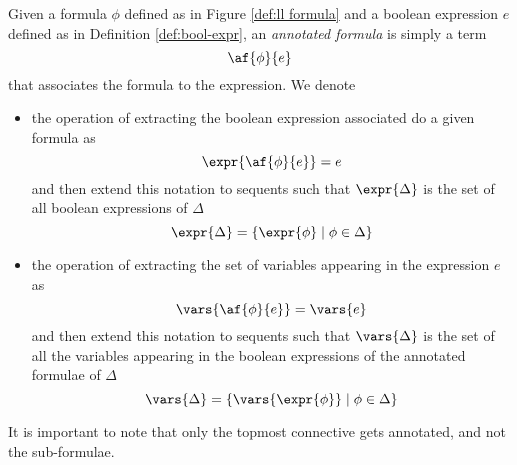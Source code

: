 \begin{define}
	\label{def:annotated}
	Given a formula $\phi$ defined as in Figure \ref{def:ll formula} and a boolean expression $e$ defined as in Definition \ref{def:bool-expr}, an \textit{annotated formula} is simply a term 
	$$ \af{\phi}{e} $$
	that associates the formula to the expression.
	We denote 
	\begin{itemize}
		\item the operation of extracting the boolean expression associated do a given formula as
			$$ \expr{\af{\phi}{e}} = e $$
			and then extend this notation to sequents such that $ \expr{\Delta} $ is the set of all boolean expressions of $\Delta$
			$$ \expr{\Delta} = \{ \expr{\phi} \mid \phi \in \Delta \} $$
		\item the operation of extracting the set of variables appearing in the expression $e$ as
			$$\vars{\af{\phi}{e}} = \vars{e} $$
			and then extend this notation to sequents such that $\vars{\Delta}$ is the set of all the variables appearing in the boolean expressions of the annotated formulae of $\Delta$
			$$ \vars{\Delta} = \{ \vars{\expr{\phi}} \mid \phi \in \Delta \} $$
	\end{itemize}
\end{define}
It is important to note that only the topmost connective gets annotated, and not the sub-formulae.

